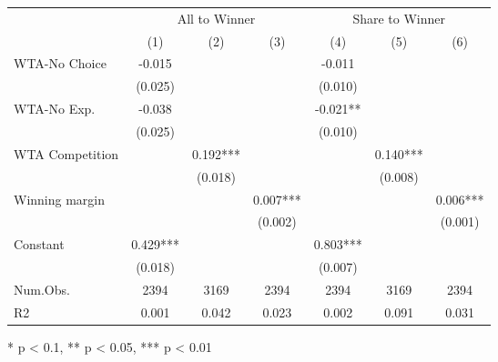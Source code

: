 \begin{table}[t]
\fontsize{12.0pt}{14.4pt}\selectfont
\begin{tabular*}{\linewidth}{@{\extracolsep{\fill}}lcccccc}
\toprule
 & \multicolumn{3}{c}{All to Winner} & \multicolumn{3}{c}{Share to Winner} \\ 
\cmidrule(lr){2-4} \cmidrule(lr){5-7}
  & (1) & (2) & (3) & (4) & (5) & (6) \\ 
\midrule\addlinespace[2.5pt]
WTA-No Choice & -0.015 &  &  & -0.011 &  &  \\ 
 & (0.025) &  &  & (0.010) &  &  \\ 
WTA-No Exp. & -0.038 &  &  & -0.021** &  &  \\ 
 & (0.025) &  &  & (0.010) &  &  \\ 
WTA Competition &  & 0.192*** &  &  & 0.140*** &  \\ 
 &  & (0.018) &  &  & (0.008) &  \\ 
Winning margin &  &  & 0.007*** &  &  & 0.006*** \\ 
 &  &  & (0.002) &  &  & (0.001) \\ 
Constant & 0.429*** &  &  & 0.803*** &  &  \\ 
{} & {(0.018)} & {} & {} & {(0.007)} & {} & {} \\ 
Num.Obs. & 2394 & 3169 & 2394 & 2394 & 3169 & 2394 \\ 
R2 & 0.001 & 0.042 & 0.023 & 0.002 & 0.091 & 0.031 \\ 
\bottomrule
\end{tabular*}
\begin{minipage}{\linewidth}
* p < 0.1, ** p < 0.05, *** p < 0.01\\
\end{minipage}
\end{table}

